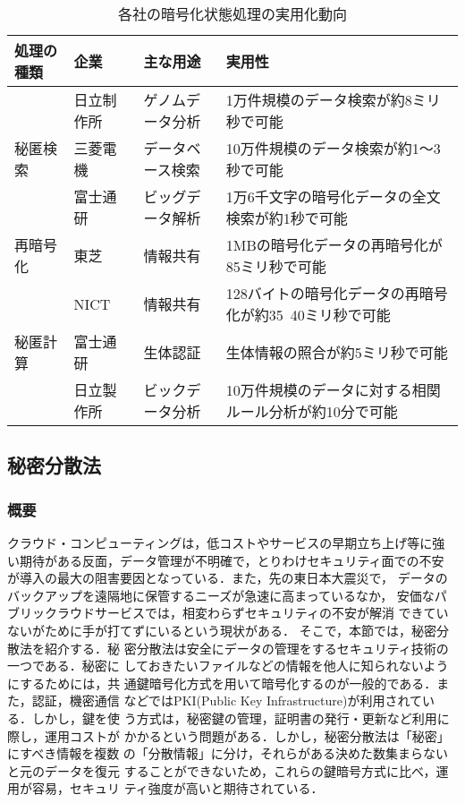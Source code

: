 \begin{table}[htbp]
  \begin{center}
    \small{
    \begin{tabular}{llll}
      \hline
      処理の種類 & 企業 & 主な用途 & 実用性\\
      \hline
      & 日立制作所 & ゲノムデータ分析 & 1万件規模のデータ検索が約8ミリ秒で可能 \cite{hitachi}\\
      秘匿検索 & 三菱電機 & データベース検索 & 10万件規模のデータ検索が約1〜3秒で可能 \cite{mitubisi}\\
      & 富士通研 & ビッグデータ解析 & 1万6千文字の暗号化データの全文検索が約1秒で可能\cite{fujitsu}\\
      \hline
      再暗号化 & 東芝 & 情報共有 & 1MBの暗号化データの再暗号化が85ミリ秒で可能 \\
      & NICT & 情報共有 & 128バイトの暗号化データの再暗号化が約35~40ミリ秒で可能\cite{nict}\\
      \hline
      秘匿計算 & 富士通研 & 生体認証 & 生体情報の照合が約5ミリ秒で可能\cite{fujitsu}\\
      & 日立製作所 & ビックデータ分析 & 10万件規模のデータに対する相関ルール分析が約10分で可能 \cite{hitachi}\\
      \hline
    \end{tabular}
    \label{tab:real}
    \caption{各社の暗号化状態処理の実用化動向}
  }
  \end{center}
\end{table}


\subsection{秘密分散法}
\subsubsection{概要}
クラウド・コンピューティングは，低コストやサービスの早期立ち上げ等に強
い期待がある反面，データ管理が不明確で，とりわけセキュリティ面での不安
が導入の最大の阻害要因となっている．また，先の東日本大震災で，
データのバックアップを遠隔地に保管するニーズが急速に高まっているなか，
安価なパブリックラウドサービスでは，相変わらずセキュリティの不安が解消
できていないがために手が打てずにいるという現状がある．
そこで，本節では，秘密分散法を紹介する．秘
密分散法は安全にデータの管理をするセキュリティ技術の一つである．秘密に
しておきたいファイルなどの情報を他人に知られないようにするためには，共
通鍵暗号化方式を用いて暗号化するのが一般的である．また，認証，機密通信
などではPKI(Public Key Infrastructure)が利用されている．しかし，鍵を使
う方式は，秘密鍵の管理，証明書の発行・更新など利用に際し，運用コストが
かかるという問題がある．しかし，秘密分散法は「秘密」にすべき情報を複数
の「分散情報」に分け，それらがある決めた数集まらないと元のデータを復元
することができないため，これらの鍵暗号方式に比べ，運用が容易，セキュリ
ティ強度が高いと期待されている．

